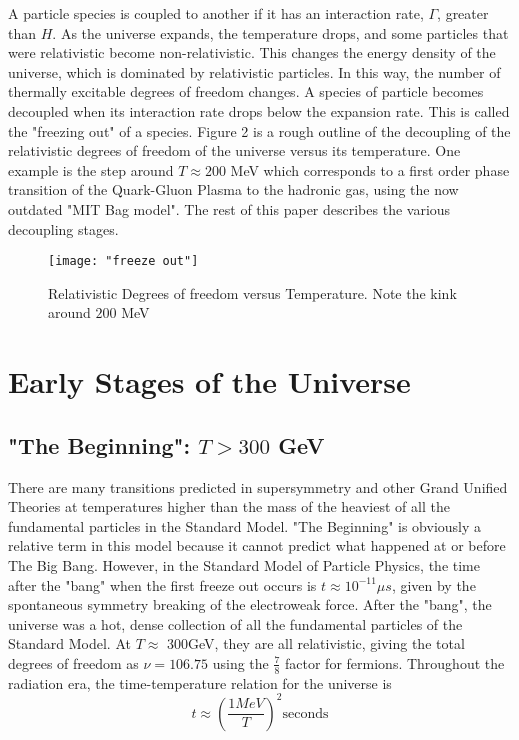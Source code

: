 \documentclass[12pt]{article}
\theoremstyle{plain}
\theoremstyle{definition}
\begin{document}
A particle species is coupled to another if it has an interaction rate, $\Gamma$, greater than $H$. As the universe expands, the temperature drops, and some particles that were relativistic become non-relativistic. This changes the energy density of the universe, which is dominated by relativistic particles. In this way, the number of thermally excitable degrees of freedom changes. A species of particle becomes decoupled when its interaction rate drops below the expansion rate. This is called the "freezing out" of a species. Figure 2 is a rough outline of the decoupling of the relativistic degrees of freedom of the universe versus its temperature. One example is the step around $T\approx200$ MeV which corresponds to a first order phase transition of the Quark-Gluon Plasma to the hadronic gas, using the now outdated "MIT Bag model". The rest of this paper describes the various decoupling stages. 
\begin{figure}[h]
	\texttt{[image: "freeze out"]}
	\centering
	\caption{Relativistic Degrees of freedom versus Temperature. Note the kink around $200$ MeV ~\cite{Kolb:1990vq}}
	\centering
\end{figure}
\section{Early Stages of the Universe}
\subsection{"The Beginning": $T>300$ GeV}
\hspace{0.2in} There are many transitions predicted in supersymmetry and other Grand Unified Theories at temperatures higher than the mass of the heaviest of all the fundamental particles in the Standard Model. "The Beginning" is obviously a relative term in this model because it cannot predict what happened at or before The Big Bang. However, in the Standard Model of Particle Physics, the time after the "bang" when the first freeze out occurs is $t\approx10^{-11}{\mu}s$, given by the spontaneous symmetry breaking of the electroweak force. After the "bang", the universe was a hot, dense collection of all the fundamental particles of the Standard Model. At $T\approx$ 300GeV, they are all relativistic, giving the total degrees of freedom as $\nu=106.75$ \cite{Kolb:1990vq} using the $\frac{7}{8}$ factor for fermions. Throughout the radiation era, the time-temperature relation for the universe is \begin{equation}
t\approx\left(\frac{1 MeV}{T}\right)^2 \mathrm{seconds}
\end{equation}
\end{document}
